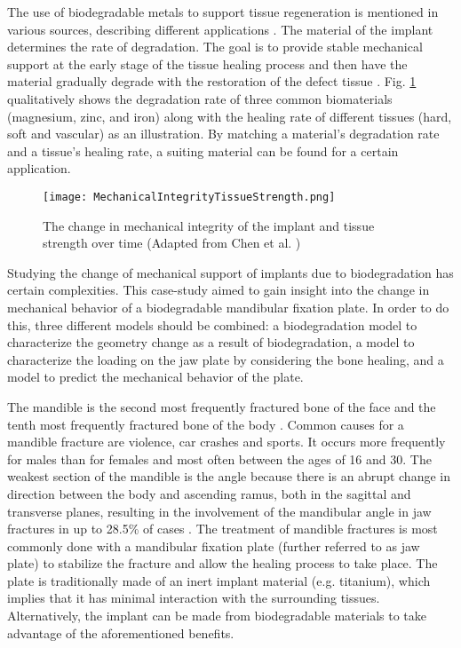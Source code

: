 The use of biodegradable metals to support tissue regeneration is mentioned in various sources, describing different applications \cite{KChen,JChen,Yang}. The material of the implant determines the rate of degradation. The goal is to provide stable mechanical support at the early stage of the tissue healing process and then have the material gradually degrade with the restoration of the defect tissue \cite{Yang}. Fig. \ref{fig:rateofdeg} qualitatively shows the degradation rate of three common biomaterials (magnesium, zinc, and iron) along with the healing rate of different tissues (hard, soft and vascular) as an illustration. By matching a material's degradation rate and a tissue's healing rate, a suiting material can be found for a certain application.

\begin{figure}[ht]
    \centering
    \texttt{[image: MechanicalIntegrityTissueStrength.png]}
    \caption{The change in mechanical integrity of the implant and tissue strength over time (Adapted from Chen et al. \cite{KChen})}
    \label{fig:rateofdeg}
\end{figure}

Studying the change of mechanical support of implants due to biodegradation has certain complexities. This case-study aimed to gain insight into the change in mechanical behavior of a biodegradable mandibular fixation plate. In order to do this, three different models should be combined: a biodegradation model to characterize the geometry change as a result of biodegradation, a model to characterize the loading on the jaw plate by considering the bone healing, and a model to predict the mechanical behavior of the plate. 

The mandible is the second most frequently fractured bone of the face and the tenth most frequently fractured bone of the body \cite{Bhavik}. Common causes for a mandible fracture are violence, car crashes and sports. It occurs more frequently for males than for females and most often between the ages of 16 and 30. The weakest section of the mandible is the angle because there is an abrupt change in direction between the body and ascending ramus, both in the sagittal and transverse planes, resulting in the involvement of the mandibular angle in jaw fractures in up to 28.5\% of cases \cite{Levy}. The treatment of mandible fractures is most commonly done with a mandibular fixation plate (further referred to as jaw plate) to stabilize the fracture and allow the healing process to take place. The plate is traditionally made of an inert implant material (e.g. titanium), which implies that it has minimal interaction with the surrounding tissues. Alternatively, the implant can be made from biodegradable materials to take advantage of the aforementioned benefits. 

